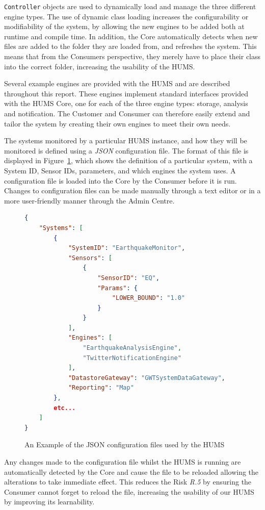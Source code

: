 \documentclass[10pt,a4paper]{article}
\begin{document}
\texttt{Controller} objects are used to dynamically load and manage the three different engine types. The use of dynamic class loading increases the configurability or modifiability of the system, by allowing the new engines to be added both at runtime and compile time. In addition, the Core automatically detects when new files are added to the folder they are loaded from, and refreshes the system. This means that from the Consumers perspective, they merely have to place their class into the correct folder, increasing the usability of the HUMS. 

Several example engines are provided with the HUMS and are described throughout this report. These engines implement standard interfaces provided with the HUMS Core, one for each of the three engine types: storage, analysis and notification. The Customer and Consumer can therefore easily extend and tailor the system by creating their own engines to meet their own needs.

The systems monitored by a particular HUMS instance, and how they will be monitored is defined using a \emph{JSON} configuration file.
The format of this file is displayed in Figure~\ref{fig:configFiles}, which shows the definition of a particular system, with a System ID, Sensor IDs, parameters, and which engines the system uses.
A configuration file is loaded into the Core by the Consumer before it is run. Changes to configuration files can be made manually through a text editor or in a more user-friendly manner through the Admin Centre.

\begin{figure}[tbp]
\begin{lstlisting}[language=json,firstnumber=1]
{
    "Systems": [
        {
            "SystemID": "EarthquakeMonitor",
            "Sensors": [
                {
                    "SensorID": "EQ",
                    "Params": {
                        "LOWER_BOUND": "1.0"
                    }
                }
            ],
            "Engines": [
                "EarthquakeAnalysisEngine",
                "TwitterNotificationEngine"
            ],
            "DatastoreGateway": "GWTSystemDataGateway",
            "Reporting": "Map"
        },
        etc...
    ]
}
\end{lstlisting}
\caption{An Example of the JSON configuration files used by the HUMS}
\label{fig:configFiles}
\end{figure}

Any changes made to the configuration file whilst the HUMS is running are automatically detected by the Core and cause the file to be reloaded allowing the alterations to take immediate effect. This reduces the Risk \emph{R.5} by ensuring the Consumer cannot forget to reload the file, increasing the usability of our HUMS by improving its learnability.
\end{document}
